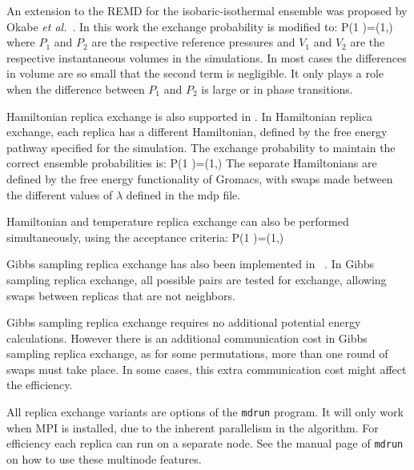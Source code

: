 An extension to the REMD for the isobaric-isothermal ensemble was
proposed by Okabe {\em et al.}~\cite{Okabe2001a}. In this work the
exchange probability is modified to:
\beq
P(1 )=\min\left(1,\exp{} \right)
\eeq
where $P_1$ and $P_2$ are the respective reference pressures and $V_1$ and
$V_2$ are the respective instantaneous volumes in the simulations.
In most cases the differences in volume are so small that the second
term is negligible. It only plays a role when the difference between
$P_1$ and $P_2$ is large or in phase transitions.

Hamiltonian replica exchange is also supported in {\gromacs}.  In
Hamiltonian replica exchange, each replica has a different
Hamiltonian, defined by the free energy pathway specified for the simulation.  The
exchange probability to maintain the correct ensemble probabilities is:
\beq P(1 )=\min\left(1,\exp{}
\right)
\eeq
The separate Hamiltonians are defined by the free energy functionality
of Gromacs, with swaps made between the different values of
$\lambda$ defined in the mdp file.

Hamiltonian and temperature replica exchange can also be performed
simultaneously, using the acceptance criteria:
\beq
P(1 )=\min\left(1,\exp{} \right)
\eeq

Gibbs sampling replica exchange has also been implemented in
{\gromacs}~\cite{Chodera2011}.  In Gibbs sampling replica exchange, all
possible pairs are tested for exchange, allowing swaps between
replicas that are not neighbors.

Gibbs sampling replica exchange requires no additional potential
energy calculations.  However there is an additional communication
cost in Gibbs sampling replica exchange, as for some permutations,
more than one round of swaps must take place.  In some cases, this
extra communication cost might affect the efficiency.

All replica exchange variants are options of the {\tt mdrun}
program. It will only work when MPI is installed, due to the inherent
parallelism in the algorithm. For efficiency each replica can run on a
separate node.  See the manual page of {\tt mdrun} on how to use these
multinode features.

